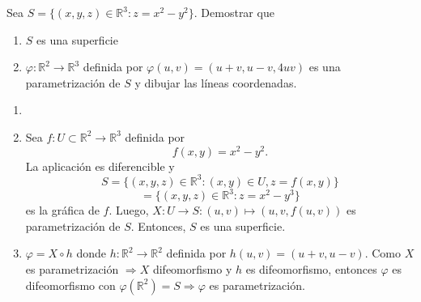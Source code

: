 \begin{ejr}[2]
  Sea $S = \{ (x, y, z) \in \mathbb{R}^{3} : z = x^{2} - y^{2} \}$. Demostrar que
  \begin{enumerate}[label=(\roman*)]
    \item $S$ es una superficie
    \item $\varphi : \mathbb{R}^{2} \to \mathbb{R}^{3}$ definida por $\varphi(u, v) = (u +v, u-v, 4uv)$ es una parametrización de $S$ y dibujar las líneas coordenadas.
  \end{enumerate}
\end{ejr}

\begin{sol}
  \begin{enumerate}[label=(\roman*)]
    \item []
    \item   Sea $f : U \subset \mathbb{R}^{2} \to \mathbb{R}^{3}$ definida por
  \[
    f(x, y) = x^{2} - y^{2}.
  \]
  La aplicación es diferencible y 
  \[ 
    S = \{ (x, y, z) \in \mathbb{R}^{3} : (x, y) \in U, z = f(x, y) \} 
  \] 
  \[ 
    = \{ (x, y, z) \in \mathbb{R}^{3} : z = x^{2} - y^{3} \} 
  \] 
  es la gráfica de $f$. Luego, $X : U \to S : (u, v) \mapsto (u, v, f(u, v))$ es parametrización de $S$. Entonces, $S$ es una superficie.

    \item $\varphi = X \circ h$ donde $h : \mathbb{R}^{2} \to \mathbb{R}^{2}$ definida por $h(u, v) = (u +v, u - v)$. Como $X$ es parametrización $\Rightarrow X$ difeomorfismo y $h$ es difeomorfismo, entonces $\varphi$ es difeomorfismo con $\varphi(\mathbb{R}^{2}) = S \Rightarrow \varphi$ es parametrización.
  \end{enumerate}
\end{sol}
